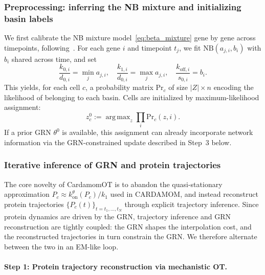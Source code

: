 \documentclass[a4paper, 11pt]{article}
\DeclareMathOperator*{\argmax}{arg\,max}
\theoremstyle{plain}
\theoremstyle{remark}
\begin{document}
\subsubsection{Preprocessing: inferring the NB mixture and initializing basin labels}
\label{subsec:Mixture_inference}

We first calibrate the NB mixture model~\eqref{eq:beta_mixture} gene by gene across timepoints, following~\cite{ventre2023one}. For each gene $i$ and timepoint $t_j$, we fit $\mathrm{NB}(a_{j,i}, b_i)$ with $b_i$ shared across time, and set
\[
\frac{k_{0,i}}{d_{0,i}} = \min_j a_{j,i},\quad
\frac{k_{1,i}}{d_{0,i}} = \max_j a_{j,i},\quad
\frac{k_{\mathrm{off},i}}{s_{0,i}} = b_i.
\]
This yields, for each cell $c$, a probability matrix $\mathrm{Pr}_c$ of size $|Z|\times n$ encoding the likelihood of belonging to each basin. Cells are initialized by maximum-likelihood assignment:
\begin{equation}
\label{basins_argmax}
z_c^0 := \argmax_z \prod_i \mathrm{Pr}_c(z,i).
\end{equation}
If a prior GRN $\theta^0$ is available, this assignment can already incorporate network information via the GRN-constrained update described in Step~3 below.

\subsubsection{Iterative inference of GRN and protein trajectories}
\label{subsec:Trajectory_and_GRN_inference}

The core novelty of CardamomOT is to abandon the quasi-stationary approximation $P_c \approx k^{\theta}_{\mathrm{on}}(P_c)/k_1$ used in CARDAMOM, and instead reconstruct protein trajectories $\{P_c(t)\}_{t=t_1,\dots,t_N}$ through explicit trajectory inference. Since protein dynamics are driven by the GRN, trajectory inference and GRN reconstruction are tightly coupled: the GRN shapes the interpolation cost, and the reconstructed trajectories in turn constrain the GRN. We therefore alternate between the two in an EM-like loop.

\paragraph{Step 1: Protein trajectory reconstruction via mechanistic OT.}
\end{document}
